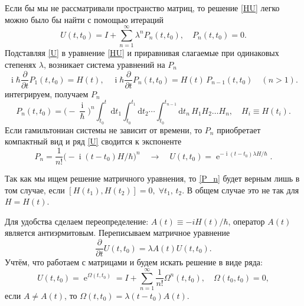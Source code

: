 \documentclass[12pt]{article}
\DeclareMathOperator{\Exp}{e}
\DeclareMathOperator\Iunit{i}
\renewcommand\exp\Exp
\renewcommand\imath\Iunit
\begin{document}
Если бы мы не рассматривали пространство матриц, то решение \eqref{HU} легко
можно было бы найти с помощью итераций
\begin{equation}\label{U}
  U(t,t_0)=I+\sum\limits_{n=1}^\infty\lambda^n P_n(t,t_0), \quad
  P_n(t,t_0)=0.
\end{equation}
Подставляя \eqref{U} в уравнение \eqref{HU} и приравнивая слагаемые при
одинаковых степенях $\lambda$, возникает система уравнений на $P_n$
\begin{equation}
  \imath\hbar\frac{\partial}{\partial t} P_1(t,t_0)=H(t), \quad
  \imath\hbar\frac{\partial}{\partial t} P_n(t,t_0)=H(t)\,P_{n-1}(t,t_0) \quad
  (n>1).
\end{equation}
интегрируем, получаем $P_n$
\begin{equation}\label{P_n}
  P_n(t,t_0)=\biggl(-\frac{\imath}{\hbar}\biggr)^n\int_{t_0}^t \text{d}t_1
  \int_{t_0}^{t_1}\text{d}t_2\cdots\int_{t_0}^{t_{n-1}}\!\!\text{d}t_n \,
  H_1 H_2\ldots H_n, \quad H_i\equiv H(t_i). 
\end{equation}
Если гамильтониан системы не зависит от времени, то $P_n$ приобретает компактный
вид и ряд \eqref{U} сводится к экспоненте
\begin{equation}
  P_n = \frac{1}{n!}\biggl(-\imath(t-t_0)H/\hbar\biggr)^n \quad\to
  \quad U(t,t_0)=\exp^{-\imath(t-t_0)\lambda H/\hbar}.
\end{equation}

Так как мы ищем решение матричного уравнения, то \eqref{P_n} будет верным лишь в
том случае, если $[H(t_1),H(t_2)]=0, \; \forall t_1,\, t_2$. В общем случае это
не так для $H=H(t)$.

Для удобства сделаем переопределение: $A(t)\equiv -iH(t)/\hbar$, оператор $A(t)$
является антиэрмитовым. Переписываем матричное уравнение
\begin{equation}
  \frac{\partial}{\partial t} U(t,t_0)=\lambda A(t) U(t,t_0).
\end{equation} 
Учтём, что работаем с матрицами и будем искать решение в виде ряда:
\begin{equation}
  U(t,t_0)=\exp^{\Omega(t,t_0)}=I+\sum_{n=1}^\infty\frac{1}{n!}\Omega^n(t,t_{0}),
  \quad \Omega(t_0,t_0)=0,
\end{equation}
если $A\neq A(t)$, то $\Omega(t,t_0)=\lambda(t-t_0)A(t)$. %
\end{document}
